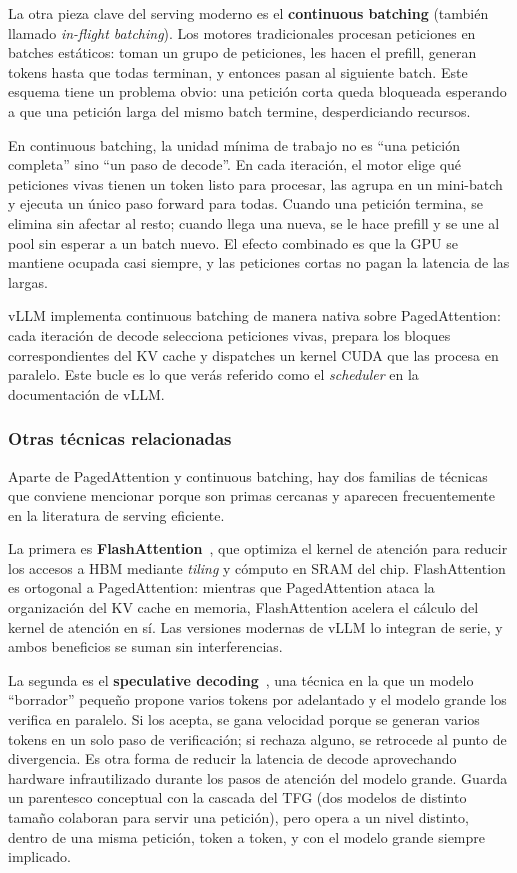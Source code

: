 \documentclass[11pt,a4paper]{article}
\begin{document}
La otra pieza clave del serving moderno es el \textbf{continuous batching} (también llamado \textit{in-flight batching}). Los motores tradicionales procesan peticiones en batches estáticos: toman un grupo de peticiones, les hacen el prefill, generan tokens hasta que todas terminan, y entonces pasan al siguiente batch. Este esquema tiene un problema obvio: una petición corta queda bloqueada esperando a que una petición larga del mismo batch termine, desperdiciando recursos.

En continuous batching, la unidad mínima de trabajo no es ``una petición completa'' sino ``un paso de decode''. En cada iteración, el motor elige qué peticiones vivas tienen un token listo para procesar, las agrupa en un mini-batch y ejecuta un único paso forward para todas. Cuando una petición termina, se elimina sin afectar al resto; cuando llega una nueva, se le hace prefill y se une al pool sin esperar a un batch nuevo. El efecto combinado es que la GPU se mantiene ocupada casi siempre, y las peticiones cortas no pagan la latencia de las largas.

vLLM implementa continuous batching de manera nativa sobre PagedAttention: cada iteración de decode selecciona peticiones vivas, prepara los bloques correspondientes del KV cache y dispatches un kernel CUDA que las procesa en paralelo. Este bucle es lo que verás referido como el \textit{scheduler} en la documentación de vLLM.

\subsubsection{Otras técnicas relacionadas}

Aparte de PagedAttention y continuous batching, hay dos familias de técnicas que conviene mencionar porque son primas cercanas y aparecen frecuentemente en la literatura de serving eficiente.

La primera es \textbf{FlashAttention}~\cite{dao2022flashattention, dao2023flash2}, que optimiza el kernel de atención para reducir los accesos a HBM mediante \textit{tiling} y cómputo en SRAM del chip. FlashAttention es ortogonal a PagedAttention: mientras que PagedAttention ataca la organización del KV cache en memoria, FlashAttention acelera el cálculo del kernel de atención en sí. Las versiones modernas de vLLM lo integran de serie, y ambos beneficios se suman sin interferencias.

La segunda es el \textbf{speculative decoding}~\cite{leviathan2023speculative}, una técnica en la que un modelo ``borrador'' pequeño propone varios tokens por adelantado y el modelo grande los verifica en paralelo. Si los acepta, se gana velocidad porque se generan varios tokens en un solo paso de verificación; si rechaza alguno, se retrocede al punto de divergencia. Es otra forma de reducir la latencia de decode aprovechando hardware infrautilizado durante los pasos de atención del modelo grande. Guarda un parentesco conceptual con la cascada del TFG (dos modelos de distinto tamaño colaboran para servir una petición), pero opera a un nivel distinto, dentro de una misma petición, token a token, y con el modelo grande siempre implicado.
\end{document}
